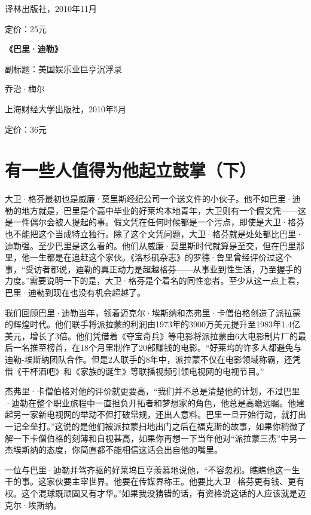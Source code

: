 译林出版社，2010年11月

定价：25元

\textbf{《巴里·迪勒》}

副标题：美国娱乐业巨亨沉浮录

乔治·梅尔

上海财经大学出版社，2010年5月

定价：36元

\hypertarget{ux6709ux4e00ux4e9bux4ebaux503cux5f97ux4e3aux4ed6ux8d77ux7acbux9f13ux638cux4e0b}{%
\section{有一些人值得为他起立鼓掌（下）}\label{ux6709ux4e00ux4e9bux4ebaux503cux5f97ux4e3aux4ed6ux8d77ux7acbux9f13ux638cux4e0b}}

大卫·格芬最初也是威廉·莫里斯经纪公司一个送文件的小伙子。他不如巴里·迪勒的地方就是，巴里是个高中毕业的好莱坞本地青年，大卫则有一个假文凭------这是一件偶尔会被人提起的事。假文凭在任何时候都是一个污点，即使是大卫·格芬也不能把这个当成特立独行。除了这个文凭问题，大卫·格芬就是处处都比巴里·迪勒强。至少巴里是这么看的。他们从威廉·莫里斯时代就算是至交，但在巴里那里，他一生都是在追赶这个家伙。《洛杉矶杂志》的罗德·鲁里曾经评价过这个事，``受访者都说，迪勒的真正动力是超越格芬------从事业到性生活，乃至握手的力度。''需要说明一下的是，大卫·格芬是个着名的同性恋者。至少从这一点上看，巴里·迪勒到现在也没有机会超越了。

我们回顾巴里·迪勒当年，领着迈克尔·埃斯纳和杰弗里·卡僧伯格创造了派拉蒙的辉煌时代。他们联手将派拉蒙的利润由1973年的3900万美元提升至1983年1.4亿美元，增长了3倍。他们凭借着《夺宝奇兵》等电影将派拉蒙由6大电影制片厂的最后一名推至榜首，在18个月里制作了20部赚钱的电影。``好莱坞的许多人都避免与迪勒-埃斯纳团队合作。但是2人联手的8年中，派拉蒙不仅在电影领域称霸，还凭借《干杯酒吧》和《家族的诞生》等联播视频引领电视网的电视节目。''

杰弗里·卡僧伯格对他的评价就更要高，``我们并不总是清楚他的计划，不过巴里·迪勒在整个职业旅程中一直担负开拓者和梦想家的角色，他总是高瞻远瞩。他建起另一家新电视网的举动不但打破常规，还出人意料。巴里一旦开始行动，就打出一记全垒打。''这说的是他们被派拉蒙扫地出门之后在福克斯的故事，如果你稍微了解一下卡僧伯格的刻薄和自视甚高，如果你再想一下当年他对``派拉蒙三杰''中另一杰埃斯纳的态度，你简直都不能相信这话会出自他的嘴里。

一位与巴里·迪勒并驾齐驱的好莱坞巨亨羡慕地说他，``不容忽视。瞧瞧他这一生干的事。这家伙要主宰世界。他要在传媒界称王。他要比大卫·格芬更有钱、更有权。这个混球既顽固又有才华。''如果我没猜错的话，有资格说这话的人应该就是迈克尔·埃斯纳。

